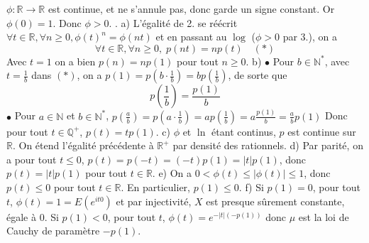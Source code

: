 \documentclass{report}
\begin{document}
$\phi:\mathbb R\to \mathbb R$ est continue, et ne s'annule pas, donc garde un signe constant. Or $\phi(0)=1$. Donc $\phi >0$. \newline
{}. a) L'égalité de 2. se réécrit $\forall t\in \mathbb R, \forall n\geq 0, \phi(t)^n = \phi(nt)$ et en passant au $\log$ ($\phi >0$ par 3.), on a $$\forall t\in \mathbb R, \forall n\geq 0,\; p(nt)=np(t) \quad (*)$$
Avec $t=1$ on a bien $p(n)=np(1)$ pour tout $n\geq 0$.\newline
\newline
b) $\bullet$ Pour $b\in \mathbb N^*$, avec $t=\frac{1}{b}$ dans $(*)$, on a $p(1)=p(b\cdot \frac{1}{b})=bp(\frac 1b)$, de sorte que $$p(\frac 1b)=\frac{p(1)}{b}$$
$\bullet$ Pour $a\in \mathbb N$ et $b\in \mathbb N^*$, $p(\frac ab) = p(a \cdot \frac{1}{b}) = a p(\frac{1}{b}) = a \frac{p(1)}{b} = \frac{a}{b}p(1)$\newline
Donc pour tout $t\in \mathbb Q^+$, $p(t)=tp(1)$.\newline
\newline
c) $\phi$ et $\ln$ étant continus, $p$ est continue sur $\mathbb R$. On étend l'égalité précédente à $\mathbb R^+$ par densité des rationnels. \newline
\newline
d) Par parité, on a pour tout $t\leq 0$, $p(t)=p(-t)=(-t)p(1)=|t|p(1)$, donc $p(t)=|t|p(1)$ pour tout $t\in \mathbb R$. \newline
\newline
e) On a $0<\phi(t)\leq |\phi(t)| \leq 1$, donc $p(t)\leq 0$ pour tout $t\in \mathbb R$. En particulier, $p(1)\leq 0$. \newline
\newline
f) Si $p(1)=0$, pour tout $t$, $\phi(t)=1=E(e^{it0})$ et par injectivité, $X$ est presque sûrement constante, égale à $0$.\newline
Si $p(1)<0$, pour tout $t$, $\phi(t)=e^{-|t| (-p(1))}$ donc $\mu$ est la loi de Cauchy de paramètre $-p(1)$.
\end{document}
